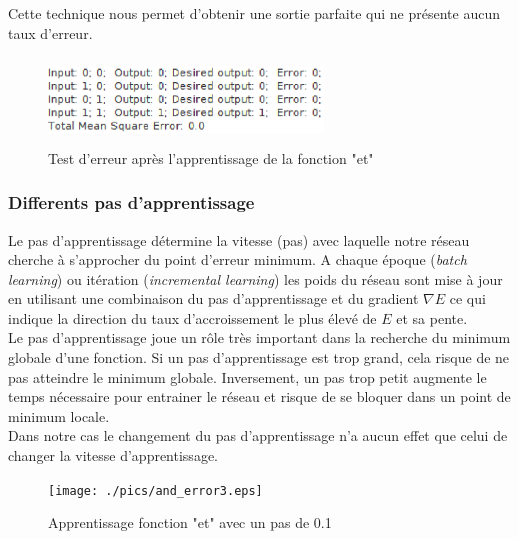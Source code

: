 \documentclass[twoside,openright,a4paper,11pt,french]{article}
\begin{document}
Cette technique nous permet d'obtenir une sortie parfaite qui ne présente
aucun taux d'erreur.



\begin{figure}[ht]
\centering
\includegraphics[width=7.3cm,height=2.3cm]{./pics/andtest2.eps}
\caption{Test d'erreur après l'apprentissage de la fonction "et"}
\label{fig:andtest2}
\end{figure}


\subsubsection{Differents pas d'apprentissage}

Le pas d'apprentissage détermine la vitesse (pas) avec laquelle notre réseau
cherche à s'approcher du point d'erreur minimum. 
A chaque époque ({\it batch learning}) ou itération ({\it incremental
learning}) les poids du réseau sont mise à jour en utilisant une combinaison du
pas d'apprentissage et du gradient $\nabla E$ ce qui indique la direction du taux
d'accroissement le plus élevé de $E$ et sa pente.\\

Le pas d'apprentissage joue un rôle très important dans la recherche du
minimum globale d'une fonction. 
Si un pas d'apprentissage est trop grand, cela risque de ne pas atteindre le minimum globale.
Inversement, un pas trop petit augmente le temps nécessaire pour entrainer le réseau et risque de
se bloquer dans un point de minimum locale.\\

Dans notre cas le changement du pas d'apprentissage n'a aucun effet que celui 
de changer la vitesse d'apprentissage.


\begin{figure}[ht]
\centering
\texttt{[image: ./pics/and\_error3.eps]}
\caption{Apprentissage fonction "et" avec un pas de 0.1}
\label{fig:anderr3}
\end{figure}
\end{document}
